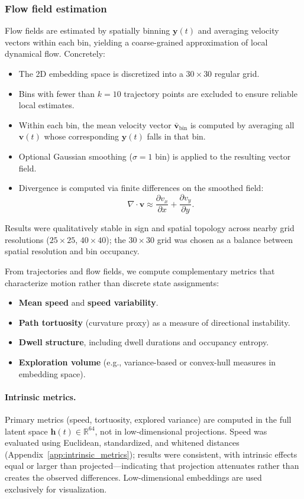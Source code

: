 \documentclass[5p,twocolumn,authoryear]{elsarticle}
\begin{document}
\subsubsection{Flow field estimation}
\label{sec:flow_field_estimation}
Flow fields are estimated by spatially binning $\mathbf{y}(t)$ and averaging velocity vectors within each bin, yielding a coarse-grained approximation of local dynamical flow. Concretely:
\begin{itemize}
    \item The 2D embedding space is discretized into a $30 \times 30$ regular grid.
    \item Bins with fewer than $k=10$ trajectory points are excluded to ensure reliable local estimates.
    \item Within each bin, the mean velocity vector $\bar{\mathbf{v}}_{\mathrm{bin}}$ is computed by averaging all $\mathbf{v}(t)$ whose corresponding $\mathbf{y}(t)$ falls in that bin.
    \item Optional Gaussian smoothing ($\sigma = 1$ bin) is applied to the resulting vector field.
    \item Divergence is computed via finite differences on the smoothed field:
    \begin{equation}
    \nabla \cdot \mathbf{v} \approx \frac{\partial v_x}{\partial x} + \frac{\partial v_y}{\partial y}.
    \end{equation}
\end{itemize}
Results were qualitatively stable in sign and spatial topology across nearby grid resolutions ($25 \times 25$, $40 \times 40$); the $30 \times 30$ grid was chosen as a balance between spatial resolution and bin occupancy.

From trajectories and flow fields, we compute complementary metrics that characterize motion rather than discrete state assignments:
\begin{itemize}
    \item \textbf{Mean speed} and \textbf{speed variability}.
    \item \textbf{Path tortuosity} (curvature proxy) as a measure of directional instability.
    \item \textbf{Dwell structure}, including dwell durations and occupancy entropy.
    \item \textbf{Exploration volume} (e.g., variance-based or convex-hull measures in embedding space).
\end{itemize}

\paragraph{Intrinsic metrics.}
Primary metrics (speed, tortuosity, explored variance) are computed in the full latent space $\mathbf{h}(t) \in \mathbb{R}^{64}$, not in low-dimensional projections. Speed was evaluated using Euclidean, standardized, and whitened distances (Appendix~\ref{app:intrinsic_metrics}); results were consistent, with intrinsic effects equal or larger than projected---indicating that projection attenuates rather than creates the observed differences. Low-dimensional embeddings are used exclusively for visualization.
\end{document}
